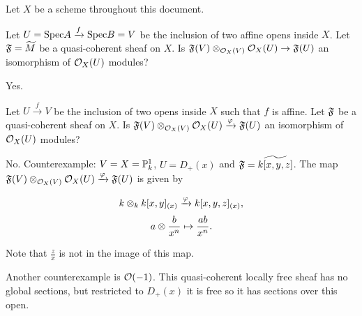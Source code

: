 



Let $X$ be a scheme throughout this document.

\begin{question}
Let $U=\Spec A \xrightarrow{f} \Spec B = V$ be the inclusion of two affine opens inside $X$.
Let $\shf=\widetilde{M}$ be a quasi-coherent sheaf on $X$. 
Is $\shf(V)\tensor_{\O_X(V)} \O_X(U) \rightarrow \shf(U)$ an isomorphism of $\O_X(U)$ modules?
\end{question}

\begin{Qanswer}
Yes. 



\end{Qanswer}

\bigskip

\begin{question}
Let $U \xrightarrow{f}  V$ be the inclusion of two opens inside $X$ such that $f$ is affine.
Let $\shf$ be a quasi-coherent sheaf on $X$. 
Is $\shf(V)\tensor_{\O_X(V)} \O_X(U) \xrightarrow{\varphi} \shf(U)$ an isomorphism of $\O_X(U)$ modules?
\end{question}


\begin{Qanswer}
No. Counterexample:  $V = X = \P_k^1$, $U=D_+(x)$ and $\shf = \widetilde{k[x,y,z]}$.
The map $\shf(V)\tensor_{\O_X(V)} \O_X(U) \xrightarrow{\varphi} \shf(U)$ is given by

\[k \tensor_{k} k[x,y]_{(x)} \xrightarrow{\varphi} k[x,y,z]_{(x)},\]
\[ a\tensor \frac{b}{x^n} \mapsto \frac{ab}{x^n}.\]

Note that $\frac{z}{x}$ is not in the image of this map.

Another counterexample is $\O(-1)$. This quasi-coherent locally free sheaf has no global sections, but restricted to $D_+(x)$ it is free so it has sections over this open.

\end{Qanswer}

\bigskip


